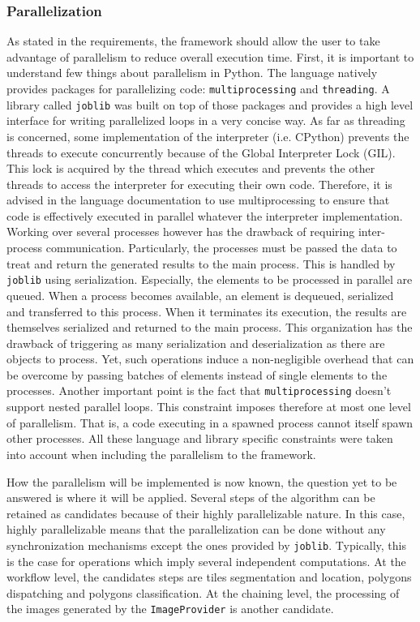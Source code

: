 \subsubsection{Parallelization}
\label{sssec:work_parallel}
As stated in the requirements, the framework should allow the user to take advantage of parallelism to reduce overall execution time. First, it is important to understand few things about parallelism in Python. The language natively provides packages for parallelizing code: \texttt{multiprocessing} and \texttt{threading}. A library called \texttt{joblib} was built on top of those packages and provides a high level interface for writing parallelized loops in a very concise way.  As far as threading is concerned, some implementation of the interpreter (i.e. CPython) prevents the threads to execute concurrently because of the Global Interpreter Lock (GIL). This lock is acquired by the thread which executes and prevents the other threads to access the interpreter for executing their own code. Therefore, it is advised in the language documentation to use multiprocessing to ensure that code is effectively executed in parallel whatever the interpreter implementation. Working over several processes however has the drawback of requiring inter-process communication. Particularly, the processes must be passed the data to treat and return the generated results to the main process. This is handled by \texttt{joblib} using serialization. Especially, the elements to be processed in parallel are queued. When a process becomes available, an element is dequeued, serialized and transferred to this process. When it terminates its execution, the results are themselves serialized and returned to the main process. This organization has the drawback of triggering as many serialization and deserialization as there are objects to process. Yet, such operations induce a non-negligible overhead that can be overcome by passing batches of elements instead of single elements to the processes. Another important point is the fact that \texttt{multiprocessing} doesn't support nested parallel loops. This constraint imposes therefore at most one level of parallelism. That is, a code executing in a spawned process cannot itself spawn other processes. All these language and library specific constraints were taken into account when including the parallelism to the framework.

How the parallelism will be implemented is now known, the question yet to be answered is where it will be applied. Several steps of the algorithm can be retained as candidates because of their highly parallelizable nature. In this case, highly parallelizable means that the parallelization can be done without any synchronization mechanisms except the ones provided by \texttt{joblib}. Typically, this is the case for operations which imply several independent computations. At the workflow level, the candidates steps are tiles segmentation and location, polygons dispatching and polygons classification. At the chaining level, the processing of the images generated by the \texttt{ImageProvider} is another candidate. 

